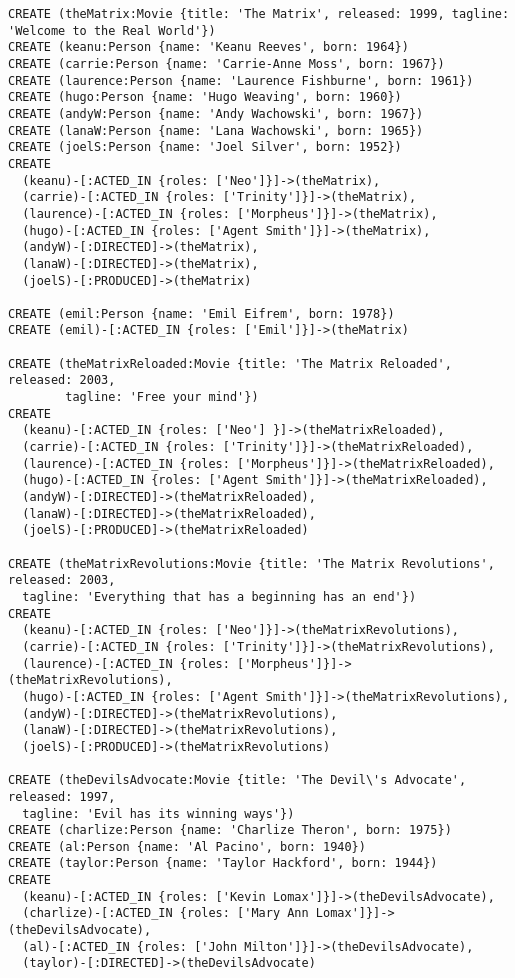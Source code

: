 \begin{lstlisting}
CREATE (theMatrix:Movie {title: 'The Matrix', released: 1999, tagline: 'Welcome to the Real World'})
CREATE (keanu:Person {name: 'Keanu Reeves', born: 1964})
CREATE (carrie:Person {name: 'Carrie-Anne Moss', born: 1967})
CREATE (laurence:Person {name: 'Laurence Fishburne', born: 1961})
CREATE (hugo:Person {name: 'Hugo Weaving', born: 1960})
CREATE (andyW:Person {name: 'Andy Wachowski', born: 1967})
CREATE (lanaW:Person {name: 'Lana Wachowski', born: 1965})
CREATE (joelS:Person {name: 'Joel Silver', born: 1952})
CREATE
  (keanu)-[:ACTED_IN {roles: ['Neo']}]->(theMatrix),
  (carrie)-[:ACTED_IN {roles: ['Trinity']}]->(theMatrix),
  (laurence)-[:ACTED_IN {roles: ['Morpheus']}]->(theMatrix),
  (hugo)-[:ACTED_IN {roles: ['Agent Smith']}]->(theMatrix),
  (andyW)-[:DIRECTED]->(theMatrix),
  (lanaW)-[:DIRECTED]->(theMatrix),
  (joelS)-[:PRODUCED]->(theMatrix)

CREATE (emil:Person {name: 'Emil Eifrem', born: 1978})
CREATE (emil)-[:ACTED_IN {roles: ['Emil']}]->(theMatrix)

CREATE (theMatrixReloaded:Movie {title: 'The Matrix Reloaded', released: 2003,
        tagline: 'Free your mind'})
CREATE
  (keanu)-[:ACTED_IN {roles: ['Neo'] }]->(theMatrixReloaded),
  (carrie)-[:ACTED_IN {roles: ['Trinity']}]->(theMatrixReloaded),
  (laurence)-[:ACTED_IN {roles: ['Morpheus']}]->(theMatrixReloaded),
  (hugo)-[:ACTED_IN {roles: ['Agent Smith']}]->(theMatrixReloaded),
  (andyW)-[:DIRECTED]->(theMatrixReloaded),
  (lanaW)-[:DIRECTED]->(theMatrixReloaded),
  (joelS)-[:PRODUCED]->(theMatrixReloaded)

CREATE (theMatrixRevolutions:Movie {title: 'The Matrix Revolutions', released: 2003,
  tagline: 'Everything that has a beginning has an end'})
CREATE
  (keanu)-[:ACTED_IN {roles: ['Neo']}]->(theMatrixRevolutions),
  (carrie)-[:ACTED_IN {roles: ['Trinity']}]->(theMatrixRevolutions),
  (laurence)-[:ACTED_IN {roles: ['Morpheus']}]->(theMatrixRevolutions),
  (hugo)-[:ACTED_IN {roles: ['Agent Smith']}]->(theMatrixRevolutions),
  (andyW)-[:DIRECTED]->(theMatrixRevolutions),
  (lanaW)-[:DIRECTED]->(theMatrixRevolutions),
  (joelS)-[:PRODUCED]->(theMatrixRevolutions)

CREATE (theDevilsAdvocate:Movie {title: 'The Devil\'s Advocate', released: 1997,
  tagline: 'Evil has its winning ways'})
CREATE (charlize:Person {name: 'Charlize Theron', born: 1975})
CREATE (al:Person {name: 'Al Pacino', born: 1940})
CREATE (taylor:Person {name: 'Taylor Hackford', born: 1944})
CREATE
  (keanu)-[:ACTED_IN {roles: ['Kevin Lomax']}]->(theDevilsAdvocate),
  (charlize)-[:ACTED_IN {roles: ['Mary Ann Lomax']}]->(theDevilsAdvocate),
  (al)-[:ACTED_IN {roles: ['John Milton']}]->(theDevilsAdvocate),
  (taylor)-[:DIRECTED]->(theDevilsAdvocate)


\end{lstlisting}
